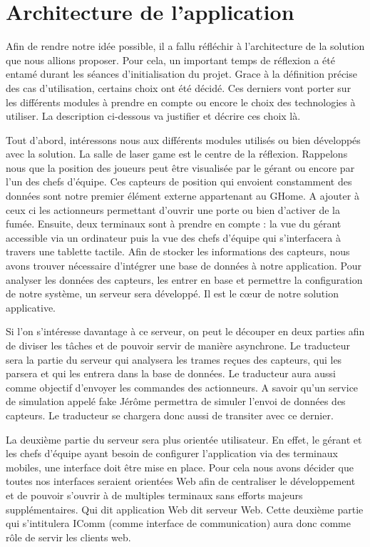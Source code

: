 \section{Architecture de l'application}

Afin de rendre notre idée possible, il a fallu réfléchir à l'architecture de la solution que nous allions proposer. Pour cela, un important temps de réflexion a été entamé durant les séances d'initialisation du projet. Grace à la définition précise des cas d'utilisation, certains choix ont été décidé. Ces derniers vont porter sur les différents modules à prendre en compte ou encore le choix des technologies à utiliser. La description ci-dessous va justifier et décrire ces choix là.

Tout d'abord, intéressons nous aux différents modules utilisés ou bien développés avec la solution. La salle de laser game est le centre de la réflexion. Rappelons nous que la position des joueurs peut être visualisée par le gérant ou encore par l'un des chefs d'équipe. Ces capteurs de position qui envoient constamment des données sont notre premier élément externe appartenant au GHome. A ajouter à ceux ci les actionneurs permettant d'ouvrir une porte ou bien d'activer de la fumée. Ensuite, deux terminaux sont à prendre en compte : la vue du gérant accessible via un ordinateur puis la vue des chefs d'équipe qui s'interfacera à travers une tablette tactile. Afin de stocker les informations des capteurs, nous avons trouver nécessaire d'intégrer une base de données à notre application. Pour analyser les données des capteurs, les entrer en base et permettre la configuration de notre système, un serveur sera développé. Il est le cœur de notre solution applicative.

Si l'on s'intéresse davantage à ce serveur, on peut le découper en deux parties afin de diviser les tâches et de pouvoir servir de manière asynchrone. Le traducteur sera la partie du serveur qui analysera les trames reçues des capteurs, qui les parsera et qui les entrera dans la base de données. Le traducteur aura aussi comme objectif d'envoyer les commandes des actionneurs. A savoir qu'un service de simulation appelé fake Jérôme permettra de simuler l'envoi de données des capteurs. Le traducteur se chargera donc aussi de transiter avec ce dernier.

La deuxième partie du serveur sera plus orientée utilisateur. En effet, le gérant et les chefs d'équipe ayant besoin de configurer l'application via des terminaux mobiles, une interface doit être mise en place. Pour cela nous avons décider que toutes nos interfaces seraient orientées Web afin de centraliser le développement et de pouvoir s'ouvrir à de multiples terminaux sans efforts majeurs supplémentaires. Qui dit application Web dit serveur Web. Cette deuxième partie qui s'intitulera IComm (comme interface de communication) aura donc comme rôle de servir les clients web.

